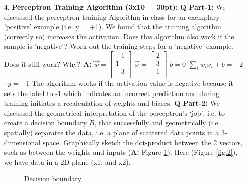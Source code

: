 \documentclass[main.tex]{subfiles}
\begin{document}
\begin{enumerate}
\item[4.] \textbf{Perceptron Training Algorithm (3x10 = 30pt):} \textbf{Q Part-1:} We discussed the perceptron training Algorithm in class for an exemplary 'positive' example (i.e. y = +1). We found that the training algorithm (correctly so) increases the activation. Does this algorithm also work if the sample is 'negative'? Work out the training steps for a 'negative' example. Does it still work? Why?  \textbf{A:}
$\vec{w} = \begin{bmatrix} -1 \\ 1 \\ -3 \\ \end{bmatrix}$ $\vec{x} = \begin{bmatrix} 2 \\ 3 \\ 1 \\ \end{bmatrix}$ $b=0$ $\sum_i w_i x_i +b = -2$ $\therefore y = -1$ The algorithm works if the activation value is negative because it sets the label to -1 which indicates an incorrect prediction and during training initiates a recalculation of weights and biases. \textbf{Q Part-2:} We discussed the geometrical interpretation of the perceptron’s ‘job’, i.e. to create a decision boundary $B$, that successfully and geometrically (i.e. spatially) separates the data, i.e. a plane of scattered data points in a 3-dimensional space. Graphically sketch the dot-product between the 2 vectors, such as between the weights and inputs (\textbf{A:} Figure \ref{fig:1}).  Here (Figure \ref{fig:2}), we have data in a 2D plane (x1, and x2). 
\begin{figure}
\centering{}
\caption{Decision boundary}
\label{fig:1}
\end{figure}
\begin{figure}
\centering{}

\end{figure}
\end{enumerate}
\end{document}
